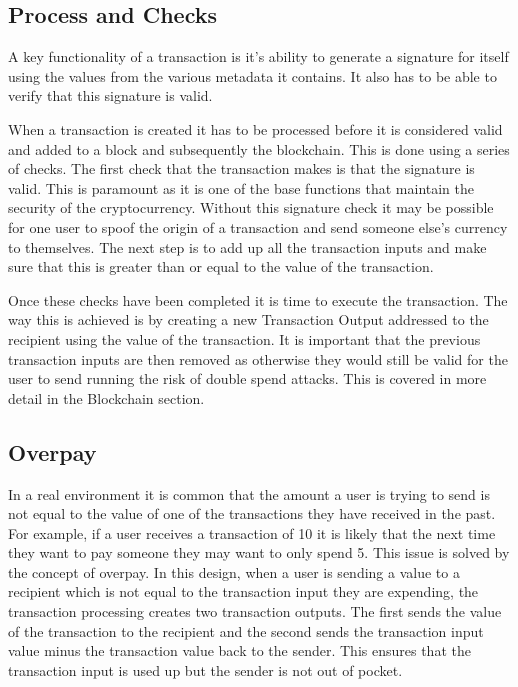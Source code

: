 \documentclass{l4proj}
\begin{document}
\subsection{Process and Checks}
A key functionality of a transaction is it's ability to generate a signature for itself using the values
from the various metadata it contains. It also has to be able to verify that this signature is valid.

When a transaction is created it has to be processed before it is considered valid and added to a block and subsequently
the blockchain. This is done using a series of checks. The first check that the transaction makes is that the
signature is valid. This is paramount as it is one of the base functions that maintain the security of the 
cryptocurrency. Without this signature check it may be possible for one user to spoof the origin of a transaction
and send someone else's currency to themselves. The next step is to add up all the transaction inputs
and make sure that this is greater than or equal to the value of the transaction.

Once these checks have been completed it is time to execute the transaction. The way this is achieved is by
creating a new Transaction Output addressed to the recipient using the value of the transaction. It is important
that the previous transaction inputs are then removed as otherwise they would still be valid for the user to send
running the risk of double spend attacks. This is covered in more detail in the Blockchain section.

\subsection{Overpay}
In a real environment it is common that the amount a user is trying to send is not equal to the value of one of
the transactions they have received in the past. For example, if a user receives a transaction of 10 it is likely
that the next time they want to pay someone they may want to only spend 5. This issue is solved by the concept of
overpay. In this design, when a user is sending a value to a recipient which is not equal to the transaction
input they are expending, the transaction processing creates two transaction outputs. The first sends the value
of the transaction to the recipient and the second sends the transaction input value minus the transaction value
back to the sender. This ensures that the transaction input is used up but the sender is not out of pocket.
\end{document}
